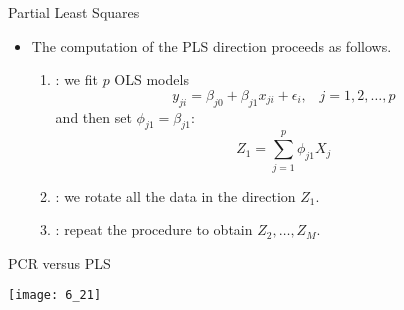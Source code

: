 \documentclass[mathserif, aspectratio=169]{beamer}
\begin{document}
\begin{frame}{Partial Least Squares}
	\begin{itemize}
		\item The computation of the PLS direction proceeds as follows.
			\begin{cpage}
				\begin{enumerate}
					\item {}: we fit  $p$ OLS models
						\[ 
						y_{ji} = \beta_{j0} + \beta_{j1} x_{ji} + \epsilon_i,
						\;\;\; j = 1, 2, \dots, p
						\]
					and then set $\phi_{j1} = \beta_{j1}$:
					\[ Z_1 = \sum_{j=1}^p \phi_{j1} X_j \]
					\item  {}: we rotate all the data in the direction $Z_1$.
					\item  {}: repeat the procedure to obtain $Z_2, \dots, Z_M$.
				\end{enumerate}
			\end{cpage}
	\end{itemize}
\end{frame}

\begin{frame}{PCR versus PLS}
	\vspace{-10mm}
	\begin{center}
		\texttt{[image: 6\_21]}
	\end{center}
\end{frame}
\end{document}
